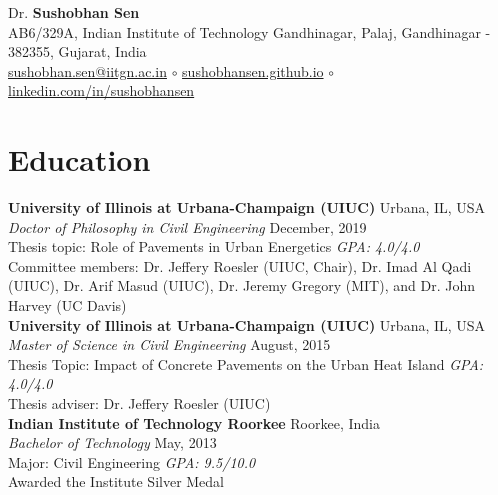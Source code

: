 \documentclass[12pt]{article}
\begin{document}
 \sloppy %
\begin{center}
{\large Dr. \textbf{Sushobhan Sen}} \\
AB6/329A, Indian Institute of Technology Gandhinagar, Palaj, Gandhinagar - 382355, Gujarat, India \\
\href{mailto:sushobhan.sen@iitgn.ac.in}{sushobhan.sen@iitgn.ac.in} $\circ$ \href{http://sushobhansen.github.io/}{sushobhansen.github.io} $\circ$ \href{http://linkedin.com/in/sushobhansen}{linkedin.com/in/sushobhansen}
\end{center} 

\hfill %
\section*{Education}
\bigskip 
\textbf{University of Illinois at Urbana-Champaign (UIUC)} \hfill Urbana, IL, USA\\
\textit{Doctor of Philosophy in Civil Engineering} \hfill December, 2019\\
Thesis topic: Role of Pavements in Urban Energetics \hfill \textit{GPA: 4.0/4.0}\\
Committee members: Dr. Jeffery Roesler (UIUC, Chair), Dr. Imad Al Qadi (UIUC), Dr. Arif Masud (UIUC), Dr. Jeremy Gregory (MIT), and Dr. John Harvey (UC Davis)\\

\textbf{University of Illinois at Urbana-Champaign (UIUC)} \hfill Urbana, IL, USA\\
\textit{Master of Science in Civil Engineering} \hfill August, 2015\\
Thesis Topic: Impact of Concrete Pavements on the Urban Heat Island \hfill \textit{GPA: 4.0/4.0} \\
Thesis adviser: Dr. Jeffery Roesler (UIUC) \\

\textbf{Indian Institute of Technology Roorkee} \hfill Roorkee, India\\
\textit{Bachelor of Technology} \hfill May, 2013\\
Major: Civil Engineering \hfill \textit{GPA: 9.5/10.0} \\
Awarded the Institute Silver Medal  %
\end{document}
